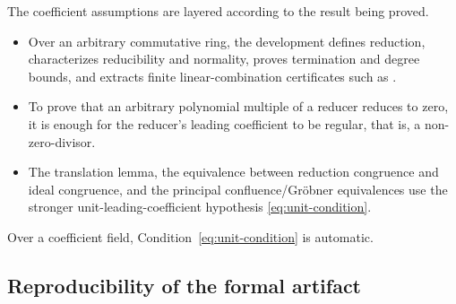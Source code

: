 The coefficient assumptions are layered according to the result being proved.
\begin{itemize}[leftmargin=2em]
  \item Over an arbitrary commutative ring, the development defines reduction,
    characterizes reducibility and normality, proves termination and degree
    bounds, and extracts finite linear-combination certificates such as
    .
  \item To prove that an arbitrary polynomial multiple of a reducer reduces to
    zero, it is enough for the reducer's leading coefficient to be regular,
    that is, a non-zero-divisor.
  \item The translation lemma, the equivalence between reduction congruence and
    ideal congruence, and the principal confluence/Gr\"obner equivalences use
    the stronger unit-leading-coefficient hypothesis
    \eqref{eq:unit-condition}.
\end{itemize}
Over a coefficient field, Condition~\eqref{eq:unit-condition} is automatic.

\subsection{Reproducibility of the formal artifact}
\label{sec:reproducibility}

